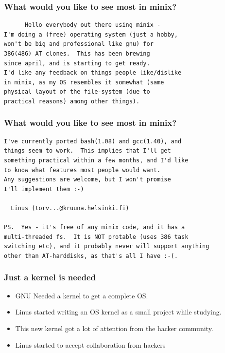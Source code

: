\documentclass[hyperref={pdfpagelabels=false},xcolor=pst,pdf,fragile]{beamer}
\begin{document}
\begin{frame}[fragile]
  \frametitle{What would you like to see most in minix?}

  \begin{lstlisting}
	  Hello everybody out there using minix -
I'm doing a (free) operating system (just a hobby,
won't be big and professional like gnu) for
386(486) AT clones.  This has been brewing
since april, and is starting to get ready.
I'd like any feedback on things people like/dislike
in minix, as my OS resembles it somewhat (same
physical layout of the file-system (due to
practical reasons) among other things).

  \end{lstlisting}

\end{frame}

\begin{frame}[fragile]
  \frametitle{What would you like to see most in minix?}

  \begin{lstlisting}
I've currently ported bash(1.08) and gcc(1.40), and
things seem to work.  This implies that I'll get
something practical within a few months, and I'd like
to know what features most people would want.
Any suggestions are welcome, but I won't promise
I'll implement them :-)

  Linus (torv...@kruuna.helsinki.fi)

PS.  Yes - it's free of any minix code, and it has a
multi-threaded fs.  It is NOT protable (uses 386 task
switching etc), and it probably never will support anything
other than AT-harddisks, as that's all I have :-(. 
  \end{lstlisting}

\end{frame}

\begin{frame}
  \frametitle{Just a kernel is needed}

  \begin{itemize}
	  \item GNU Needed a kernel to get a complete OS.
	  \item Linus started writing an OS kernel as a small project while
		  studying.
  \end{itemize}

  \hskip-20pt

  \begin{itemize}
	  \item This new kernel got a lot of attention from the hacker
		  community. 
		  \pause
	  \item \alert{Linus started to accept collaboration from hackers}
  \end{itemize}
\end{frame}
\end{document}

